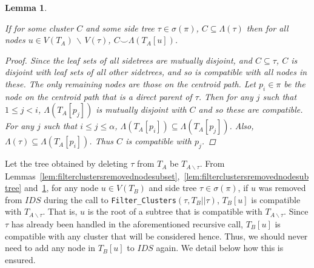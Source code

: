 \documentclass{article}
\newcommand{\compatible}{\smile}
\newcommand{\leafset}{\Lambda}
\newtheorem{filterclusterssidetreecompatibility}[incompatibility]{Lemma}
\begin{document}
    \begin{filterclusterssidetreecompatibility}
        \label{lem:filterclusterssidetreecompatibility}

        If for some cluster $C$ and some side tree $\tau \in \sigma(\pi)$, $C \subseteq \Lambda(\tau)$ then for all nodes $u \in V(T_A)\, \backslash\, V(\tau)$, $C \compatible \leafset(T_A[u])$.

        \begin{proof}
            Since the leaf sets of all sidetrees are mutually disjoint, and $C \subseteq \tau$, $C$ is disjoint with leaf sets of all other sidetrees, and so is compatible with all nodes in these. The only remaining nodes are those on the centroid path. Let $p_i \in \pi$ be the node on the centroid path that is a direct parent of $\tau$. Then for any $j$ such that $1 \leq j < i$, $\Lambda(T_A[p_j])$ is mutually disjoint with $C$ and so these are compatible. For any $j$ such that $i \leq j \leq \alpha$, $\Lambda(T_A[p_i]) \subseteq \Lambda(T_A[p_j])$. Also, $\Lambda(\tau) \subseteq \Lambda(T_A[p_i])$. Thus $C$ is compatible with $p_j$.
        \end{proof}
    \end{filterclusterssidetreecompatibility}

    Let the tree obtained by deleting $\tau$ from $T_A$ be $T_{A \backslash \tau}$. From Lemmas~\ref{lem:filterclustersremovednodesubset},~\ref{lem:filterclustersremovednodesubtree} and~\ref{lem:filterclusterssidetreecompatibility}, for any node $u \in V(T_B)$ and side tree $\tau \in \sigma(\pi)$, if $u$ was removed from $IDS$ during the call to \texttt{Filter\_Clusters}$(\tau, T_B||\tau)$, $T_B[u]$ is compatible with $T_{A \backslash \tau}$. That is, $u$ is the root of a subtree that is compatible with $T_{A \backslash \tau}$. Since $\tau$ has already been handled in the aforementioned recursive call, $T_B[u]$ is compatible with any cluster that will be considered hence. Thus, we should never need to add any node in $T_B[u]$ to $IDS$ again. We detail below how this is ensured.\\
\end{document}
